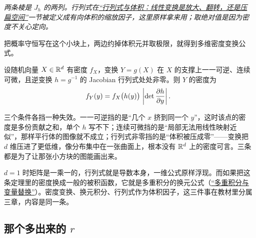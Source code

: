 \begin{center}

\emph{两条棱是 \(J_h\) 的两列。行列式在\hyperref[sec:03-Linear-Algebra/04-Determinants/01]{``行列式与体积：线性变换是放大、翻转，还是压扁空间''}一节被定义成有向体积的缩放因子，这里原样拿来用；取绝对值是因为密度不关心定向。}
\end{center}

把概率守恒写在这个小块上，两边约掉体积元并取极限，就得到多维密度变换公式。

\begin{theorem}
设随机向量 \(X\in\mathbb{R}^d\) 有密度 \(f_X\)，变换 \(Y=g(X)\) 在 \(X\) 的支撑上一一可逆、连续可微，且逆变换 \(h=g^{-1}\) 的 Jacobian 行列式处处非零。则 \(Y\) 的密度为
\[
f_Y(y)=f_X\bigl(h(y)\bigr)\,
\left|\det \frac{\partial h}{\partial y}\right| .
\]
\end{theorem}

三个条件各挡一种失效。一一可逆挡的是``几个 \(x\) 挤到同一个 \(y\)''，这时该点的密度是多份贡献之和，单个 \(h\) 写不下；连续可微挡的是``局部无法用线性映射近似''，那样平行体的图像就不成立；行列式非零挡的是``体积被压成零''——变换把 \(d\) 维压进了更低维，像分布集中在一张曲面上，根本没有 \(\mathbb{R}^d\) 上的密度可言。三条都是为了让那张小方块的图能画出来。

\(d=1\) 时矩阵是一乘一的，行列式就是导数本身，一维公式原样浮现。而如果把这条定理里的密度换成一般的被积函数，它就是多重积分的换元公式（\hyperref[sec:02-Calculus/06-Multivariable-Calculus/07]{``多重积分与变量替换''}）。密度变换、换元积分、行列式作为体积因子，这三件事在教材里分属三章，内容是同一条。

\subsection{那个多出来的 \texorpdfstring{\(r\)}{r}}

